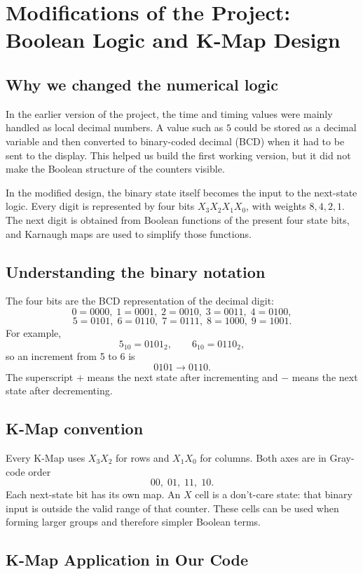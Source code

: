 \documentclass[12pt,letterpaper]{article}
\begin{document}
\section{Modifications of the Project: Boolean Logic and K-Map Design}

\subsection{Why we changed the numerical logic}

In the earlier version of the project, the time and timing values were mainly
handled as local decimal numbers. A value such as \(5\) could be stored as a
decimal variable and then converted to binary-coded decimal (BCD) when it
had to be sent to the display. This helped us build the first working version,
but it did not make the Boolean structure of the counters visible.

In the modified design, the binary state itself becomes the input to the
next-state logic. Every digit is represented by four bits
\(X_3X_2X_1X_0\), with weights \(8,4,2,1\). The next digit is obtained from
Boolean functions of the present four state bits, and Karnaugh maps are used
to simplify those functions.

\subsection{Understanding the binary notation}

The four bits are the BCD representation of the decimal digit:
\[
0=0000,\;1=0001,\;2=0010,\;3=0011,\;4=0100,
\]
\[
5=0101,\;6=0110,\;7=0111,\;8=1000,\;9=1001.
\]
For example,
\[
5_{10}=0101_2,\qquad 6_{10}=0110_2,
\]
so an increment from 5 to 6 is
\[
0101\longrightarrow0110.
\]
The superscript \(+\) means the next state after incrementing and
\( - \) means the next state after decrementing.

\subsection{K-Map convention}

Every K-Map uses \(X_3X_2\) for rows and \(X_1X_0\) for columns. Both axes
are in Gray-code order
\[
00,\;01,\;11,\;10.
\]
Each next-state bit has its own map. An \(X\) cell is a don't-care state:
that binary input is outside the valid range of that counter. These cells
can be used when forming larger groups and therefore simpler Boolean terms.

\subsection{K-Map Application in Our Code}
\end{document}
